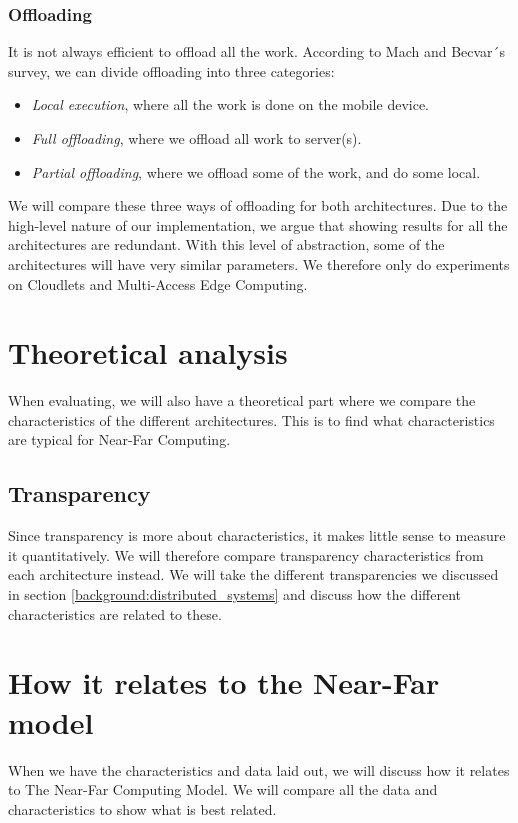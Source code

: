 \subsubsection{Offloading}
It is not always efficient to offload all the work. According to Mach and Becvar´s survey\cite{mach_mobile_2017}, we can divide offloading into three categories:
\begin{itemize}
    \item \textit{Local execution}, where all the work is done on the mobile device.
    \item \textit{Full offloading}, where we offload all work to server(s).
    \item \textit{Partial offloading}, where we offload some of the work, and do some local.
\end{itemize}
We will compare these three ways of offloading for both architectures.
Due to the high-level nature of our implementation, we argue that showing results for all the architectures are redundant. With this level of abstraction, some of the architectures will have very similar parameters. We therefore only do experiments on Cloudlets and Multi-Access Edge Computing.














\section{Theoretical analysis}
When evaluating, we will also have a theoretical part where we compare the characteristics of the different architectures. This is to find what characteristics are typical for Near-Far Computing.

\subsection{Transparency}
Since transparency is more about characteristics, it makes little sense to measure it quantitatively. We will therefore compare transparency characteristics from each architecture instead. We will take the different transparencies we discussed in section \ref{background:distributed_systems} and discuss how the different characteristics are related to these.




\section{How it relates to the Near-Far model}
When we have the characteristics and data laid out, we will discuss how it relates to The Near-Far Computing Model. We will compare all the data and characteristics to show what is best related.









